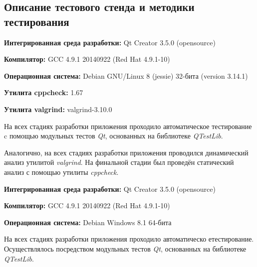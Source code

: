 \documentclass[12pt,a4paper]{report}
\begin{document}
\subsection{Описание тестового стенда и методики тестирования}

\begin{flushleft}
\textbf{Интегрированная среда разработки:} Qt Creator 3.5.0 (opensource)

\textbf{Компилятор:} GCC 4.9.1 20140922 (Red Hat 4.9.1-10)

\textbf{Операционная система:} Debian GNU/Linux 8 (jessie) 32-бита (version 3.14.1)

\textbf{Утилита cppcheck:} 1.67

\textbf{Утилита valgrind:} valgrind-3.10.0
\end{flushleft}

На всех стадиях разработки приложения проходило автоматическое тестирование c помощью модульных тестов \textit{Qt}, основанных на библиотеке  \textit{QTestLib}.

Аналогично, на всех стадиях разработки приложения проводился динамический анализ утилитой \textit{valgrind}.
На финальной стадии был проведён статический анализ с помощью утилиты \textit{cppcheck}.\begin{flushleft}
\textbf{Интегрированная среда разработки:} Qt Creator 3.5.0 (opensource)

\textbf{Компилятор:} GCC 4.9.1 20140922 (Red Hat 4.9.1-10)

\textbf{Операционная система:} Debian Windows 8.1 64-бита

\end{flushleft}

На всех стадиях разработки приложения проходило автоматическо етестирование. Осуществлялось посредством модульных тестов \textit{Qt}, основанных на библиотеке  \textit{QTestLib}. 
\end{document}
